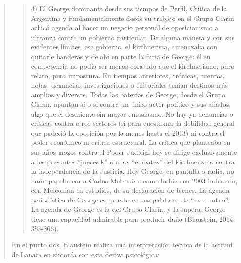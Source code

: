 \begin{quote}
\begin{quote}
	4) El George dominante desde sus tiempos de Perfil, Crítica de la Argentina y fundamentalmente desde su trabajo en el Grupo Clarín achicó agenda al hacer un negocio personal de oposicionismo a ultranza contra un gobierno particular. De alguna manera y con sus evidentes límites, ese gobierno, el kirchnerista, amenazaba con quitarle banderas y de ahí en parte la furia de George: él en competencia no podía ser menos corajudo que el kirchnerismo, puro relato, pura impostura. En tiempos anteriores, crónicas, cuentos, notas, denuncias, investigaciones o editoriales tenían destinos más amplios y diversos. Todas las baterías de George, desde el Grupo Clarín, apuntan sí o sí contra un único actor político y sus aliados, algo que él desmiente sin mayor entusiasmo. No hay ya denuncias o críticas contra otros sectores (sí para cuestionar la debilidad general que padeció la oposición por lo menos hasta el 2013) ni contra el poder económico ni crítica estructural. La crítica que planteaba en sus años mozos contra el Poder Judicial hoy se dirige exclusivamente a los presuntos \enquote{jueces k} o a los \enquote{embates} del kirchnerismo contra la independencia de la Justicia. Hoy George, en pantalla o radio, no haría papelonear a Carlos Melconian como lo hizo en 2003 hablando, con Melconian en estudios, de su declaración de bienes. La agenda periodística de George es, puesto en sus palabras, de ``uso mutuo''. La agenda de George es la del Grupo Clarín, y la supera. George tiene una capacidad admirable para producir daño (Blaustein, 2014: 355-366).
\end{quote}


En el punto dos, Blaustein realiza una interpretación teórica de la actitud de Lanata en sintonía con esta deriva psicológica:


\end{quote}
